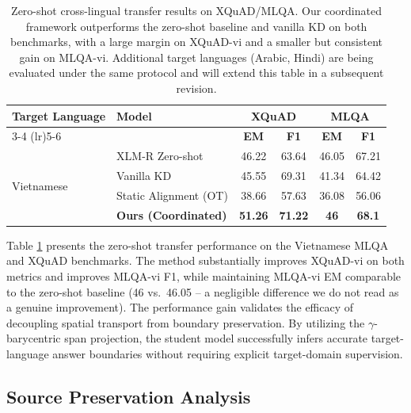 \documentclass[11pt]{article}
\begin{document}
\begin{table}[t]
\centering
\begin{tabular}{llcccc}
\toprule
\multirow{2}{*}{\textbf{Target Language}} & \multirow{2}{*}{\textbf{Model}} & \multicolumn{2}{c}{\textbf{XQuAD}} & \multicolumn{2}{c}{\textbf{MLQA}} \\
\cmidrule(lr){3-4} \cmidrule(lr){5-6}
 & & \textbf{EM} & \textbf{F1} & \textbf{EM} & \textbf{F1} \\
\midrule
\multirow{4}{*}{Vietnamese}
 & XLM-R Zero-shot & 46.22 & 63.64 & 46.05 & 67.21 \\
 & Vanilla KD & 45.55 & 69.31 & 41.34 & 64.42 \\
 & Static Alignment (OT) & 38.66 & 57.63 & 36.08 & 56.06 \\
 & \textbf{Ours (Coordinated)} & \textbf{51.26} & \textbf{71.22} & \textbf{46} & \textbf{68.1} \\
\bottomrule
\end{tabular}
\caption{Zero-shot cross-lingual transfer results on XQuAD/MLQA. Our coordinated framework outperforms the zero-shot baseline and vanilla KD on both benchmarks, with a large margin on XQuAD-vi and a smaller but consistent gain on MLQA-vi. Additional target languages (Arabic, Hindi) are being evaluated under the same protocol and will extend this table in a subsequent revision.}
\label{tab:main_results}
\end{table}

Table \ref{tab:main_results} presents the zero-shot transfer performance on the Vietnamese MLQA and XQuAD benchmarks. The method substantially improves XQuAD-vi on both metrics and improves MLQA-vi F1, while maintaining MLQA-vi EM comparable to the zero-shot baseline (46 vs.\ 46.05 -- a negligible difference we do not read as a genuine improvement). The performance gain validates the efficacy of decoupling spatial transport from boundary preservation. By utilizing the $\gamma$-barycentric span projection, the student model successfully infers accurate target-language answer boundaries without requiring explicit target-domain supervision.

\subsection{Source Preservation Analysis}
\end{document}
